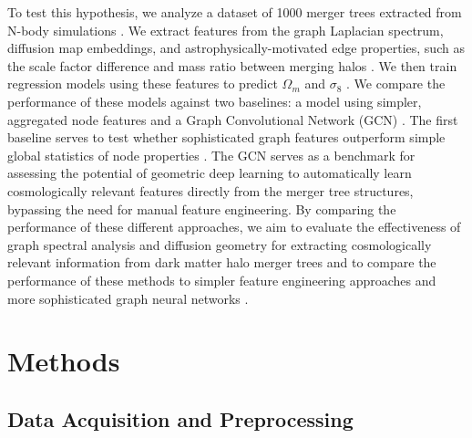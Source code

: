 \documentclass[twocolumn]{aastex631}
\begin{document}
To test this hypothesis, we analyze a dataset of 1000 merger trees extracted from N-body simulations \citep{bose2022constructinghighfidelityhalomerger}. We extract features from the graph Laplacian spectrum, diffusion map embeddings, and astrophysically-motivated edge properties, such as the scale factor difference and mass ratio between merging halos \citep{bose2022constructinghighfidelityhalomerger,chandrogómez2025accuracydarkmatterhalo}. We then train regression models using these features to predict $\Omega_m$ and $\sigma_8$ \citep{chandrogómez2025accuracydarkmatterhalo}. We compare the performance of these models against two baselines: a model using simpler, aggregated node features and a Graph Convolutional Network (GCN) \citep{bose2022constructinghighfidelityhalomerger,jung2024mergertreebasedgalaxymatching}. The first baseline serves to test whether sophisticated graph features outperform simple global statistics of node properties \citep{bose2022constructinghighfidelityhalomerger}. The GCN serves as a benchmark for assessing the potential of geometric deep learning to automatically learn cosmologically relevant features directly from the merger tree structures, bypassing the need for manual feature engineering. By comparing the performance of these different approaches, we aim to evaluate the effectiveness of graph spectral analysis and diffusion geometry for extracting cosmologically relevant information from dark matter halo merger trees and to compare the performance of these methods to simpler feature engineering approaches and more sophisticated graph neural networks \citep{bose2022constructinghighfidelityhalomerger,jung2024mergertreebasedgalaxymatching,chandrogómez2025accuracydarkmatterhalo}.
\
\

\section{Methods}
\label{sec:methods}
\subsection{Data Acquisition and Preprocessing}
\end{document}
